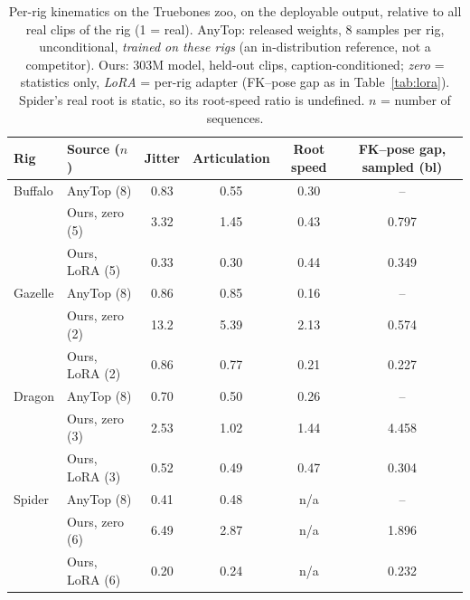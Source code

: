 \begin{table}[t]
\centering\small
\caption{Per-rig kinematics on the Truebones zoo, on the deployable output, relative
to all real clips of the rig (1 = real). AnyTop: released weights, 8 samples per rig,
unconditional, \emph{trained on these rigs} (an in-distribution reference, not a competitor).
Ours: \num{303}M model, held-out clips, caption-conditioned;
\emph{zero} = statistics only, \emph{LoRA} = per-rig adapter (FK--pose gap as in
Table~\ref{tab:lora}). Spider's real root is static, so its
root-speed ratio is undefined. $n$ = number of sequences.}\label{tab:anytop}
\begin{tabular}{llcccc}
\toprule
Rig & Source ($n$) & Jitter & Articulation & Root speed & FK--pose gap, sampled (bl) \\
\midrule
Buffalo & AnyTop (8) & \num{0.83} & \num{0.55} & \num{0.30} & -- \\
        & Ours, zero (5) & \num{3.32} & \num{1.45} & \num{0.43} & \num{0.797} \\
        & Ours, LoRA (5) & \num{0.33} & \num{0.30} & \num{0.44} & \num{0.349} \\
\midrule
Gazelle & AnyTop (8) & \num{0.86} & \num{0.85} & \num{0.16} & -- \\
        & Ours, zero (2) & \num{13.2} & \num{5.39} & \num{2.13} & \num{0.574} \\
        & Ours, LoRA (2) & \num{0.86} & \num{0.77} & \num{0.21} & \num{0.227} \\
\midrule
Dragon  & AnyTop (8) & \num{0.70} & \num{0.50} & \num{0.26} & -- \\
        & Ours, zero (3) & \num{2.53} & \num{1.02} & \num{1.44} & \num{4.458} \\
        & Ours, LoRA (3) & \num{0.52} & \num{0.49} & \num{0.47} & \num{0.304} \\
\midrule
Spider  & AnyTop (8) & \num{0.41} & \num{0.48} & n/a & -- \\
        & Ours, zero (6) & \num{6.49} & \num{2.87} & n/a & \num{1.896} \\
        & Ours, LoRA (6) & \num{0.20} & \num{0.24} & n/a & \num{0.232} \\
\bottomrule
\end{tabular}
\end{table}



